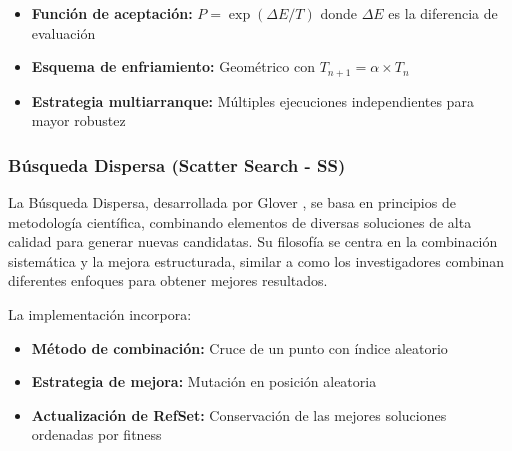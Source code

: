 \begin{itemize}
    \item \textbf{Función de aceptación:} $P = \exp(\Delta E / T)$ donde $\Delta E$ es la diferencia de evaluación
    \item \textbf{Esquema de enfriamiento:} Geométrico con $T_{n+1} = \alpha \times T_n$
    \item \textbf{Estrategia multiarranque:} Múltiples ejecuciones independientes para mayor robustez
\end{itemize}

\subsubsection{Búsqueda Dispersa (Scatter Search - SS)}

La Búsqueda Dispersa, desarrollada por Glover \cite{glover1998template}, se basa en principios de metodología científica, combinando elementos de diversas soluciones de alta calidad para generar nuevas candidatas. Su filosofía se centra en la combinación sistemática y la mejora estructurada, similar a como los investigadores combinan diferentes enfoques para obtener mejores resultados.

\begin{table}[htbp]
\centering
{}
\caption{Configuración de parámetros del algoritmo SS.}
\label{tab:parametros_ss}
\end{table}

La implementación incorpora:
\begin{itemize}
    \item \textbf{Método de combinación:} Cruce de un punto con índice aleatorio
    \item \textbf{Estrategia de mejora:} Mutación en posición aleatoria
    \item \textbf{Actualización de RefSet:} Conservación de las mejores soluciones ordenadas por fitness
\end{itemize}

